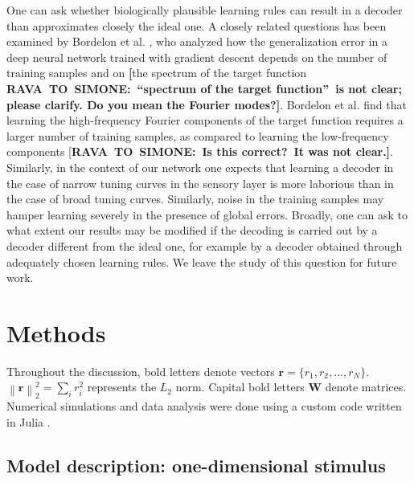 \documentclass[a4paper]{article}%
\begin{document}
One can ask whether biologically plausible learning rules can result in a
decoder than approximates closely the ideal one. A closely related questions
has been examined by Bordelon et al. \cite{Bordelon2020SpectrumNetworks}, who
analyzed how the generalization error in a deep neural network trained with
gradient descent depends on the number of training samples and on
\textbf{[}the spectrum of the target function
\textbf{RAVA\ TO\ SIMONE:\ \textquotedblleft spectrum of the target
function\textquotedblright\ is not clear; please clarify. Do you mean the
Fourier modes?]}. Bordelon et al. \cite{Bordelon2021PopulationBias} find that
learning the high-frequency Fourier components of the target function requires
a larger number of training samples, as compared to learning the low-frequency
components [\textbf{RAVA\ TO\ SIMONE:\ Is this correct?\ It was not clear.]}.
Similarly, in the context of our network one expects that learning a decoder
in the case of narrow tuning curves in the sensory layer is more laborious
than in the case of broad tuning curves. Similarly, noise in the training
samples may hamper learning severely in the presence of global errors.
Broadly, one can ask to what extent our results may be modified if the
decoding is carried out by a decoder different from the ideal one, for example
by a decoder obtained through adequately chosen learning rules. We leave the
study of this question for future work.

\section{Methods}

\label{Se:Me} Throughout the discussion, bold letters denote vectors
$\mathbf{r} = \{r_{1},r_{2},...,r_{N} \}$. $\left\|  \mathbf{r} \right\|
_{2}^{2} = \sum_{i} r_{i}^{2}$ represents the $L_{2}$ norm. Capital bold
letters $\mathbf{W}$ denote matrices. Numerical simulations and data analysis
were done using a custom code written in Julia
\cite{Bezanson2017Julia:Computing}.

\subsection*{Model description: one-dimensional stimulus}
\end{document}
